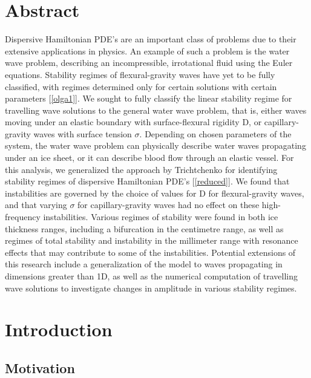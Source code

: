 \documentclass{article}
\begin{document}
\setlength{\parindent}{0pt}

\section{Abstract}

Dispersive Hamiltonian PDE's are an important class of problems due to their extensive applications in physics. An example of such a problem is the water wave problem, describing an incompressible, irrotational fluid using the Euler equations. Stability regimes of flexural-gravity waves have yet to be fully classified, with regimes determined only for certain solutions with certain parameters [\ref{olga1}]. We sought to fully classify the linear stability regime for travelling wave solutions to the general water wave problem, that is, either waves moving under an elastic boundary with surface-flexural rigidity D, or capillary-gravity waves with surface tension \(\sigma\). Depending on chosen parameters of the system, the water wave problem can physically describe water waves propagating under an ice sheet, or it can describe blood flow through an elastic vessel. For this analysis, we generalized the approach by Trichtchenko for identifying stability regimes of dispersive Hamiltonian PDE’s [\ref{reduced}]. We found that instabilities are governed by the choice of values for D for flexural-gravity waves, and that varying \(\sigma\) for capillary-gravity waves had no effect on these high-frequency instabilities. Various regimes of stability were found in both ice thickness ranges, including a bifurcation in the centimetre range, as well as regimes of total stability and instability in the millimeter range with resonance effects that may contribute to some of the instabilities. Potential extensions of this research include a generalization of the model to waves propagating in dimensions greater than 1D, as well as the numerical computation of travelling wave solutions to investigate changes in amplitude in various stability regimes. 


\clearpage 


\section{Introduction}



\subsection{Motivation}
\end{document}
